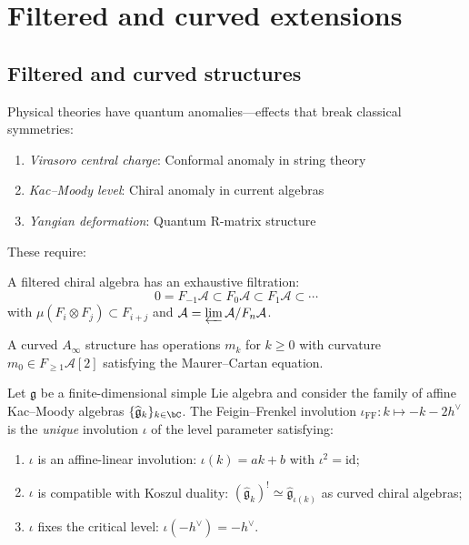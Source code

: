 \section{Filtered and curved extensions}

\subsection{Filtered and curved structures}

Physical theories have quantum anomalies—effects that break classical symmetries:

\begin{example}\label{ex:central-ext-physics}
\begin{enumerate}
\item \emph{Virasoro central charge}: Conformal anomaly in string theory
\item \emph{Kac--Moody level}: Chiral anomaly in current algebras  
\item \emph{Yangian deformation}: Quantum R-matrix structure
\end{enumerate}
\end{example}

These require:

\begin{definition}
A filtered chiral algebra has an exhaustive filtration:
\[0 = F_{-1}\mathcal{A} \subset F_0\mathcal{A} \subset F_1\mathcal{A} \subset \cdots\]
with $\mu(F_i \otimes F_j) \subset F_{i+j}$ and $\mathcal{A} = \varprojlim \mathcal{A}/F_n\mathcal{A}$.
\end{definition}

\begin{definition}\label{def:curved-ainfty-kp}
A curved $A_\infty$ structure has operations $m_k$ for $k \geq 0$ with curvature $m_0 \in F_{\geq 1}\mathcal{A}[2]$ satisfying the Maurer--Cartan equation.
\end{definition}

\begin{proposition}
\label{prop:ff-involution-uniqueness}
Let $\mathfrak{g}$ be a finite-dimensional simple Lie algebra and
consider the family of affine Kac--Moody algebras
$\{\widehat{\mathfrak{g}}_k\}_{k \in \bC}$.  The Feigin--Frenkel
involution $\iota_{\mathrm{FF}}: k \mapsto -k - 2h^\vee$ is the
\emph{unique} involution $\iota$ of the level parameter satisfying:
\begin{enumerate}[label=\textup{(\roman*)}]
\item $\iota$ is an affine-linear involution: $\iota(k) = ak + b$
   with $\iota^2 = \mathrm{id}$;
\item $\iota$ is compatible with Koszul duality:
   $(\widehat{\mathfrak{g}}_k)^! \simeq \widehat{\mathfrak{g}}_{\iota(k)}$
   as curved chiral algebras;
\item $\iota$ fixes the critical level: $\iota(-h^\vee) = -h^\vee$.
\end{enumerate}
\end{proposition}

